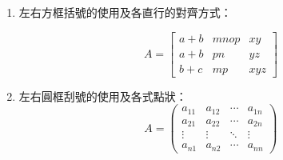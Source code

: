 \begin{enumerate}
  \item 左右方框括號的使用及各直行的對齊方式：
 
        $$ A = \left[
            \begin{array}{clr}
                a+b & mnop  & xy \\
                a+b & pn    & yz \\
                b+c & mp    & xyz
            \end{array} \right] $$

  \item 左右圓框刮號的使用及各式點狀：
        $$ A=\left(
            \begin{array}{cccc}
                a_{11} 	& a_{12} & \cdots 	& a_{1n}\\
                a_{21} 	& a_{22} & \cdots 	& a_{2n}\\
                \vdots 	& \vdots & \ddots	& \vdots\\
                a_{n1} 	& a_{n2} & \cdots 	& a_{nn}
            \end{array} \right) $$


\end{enumerate}
